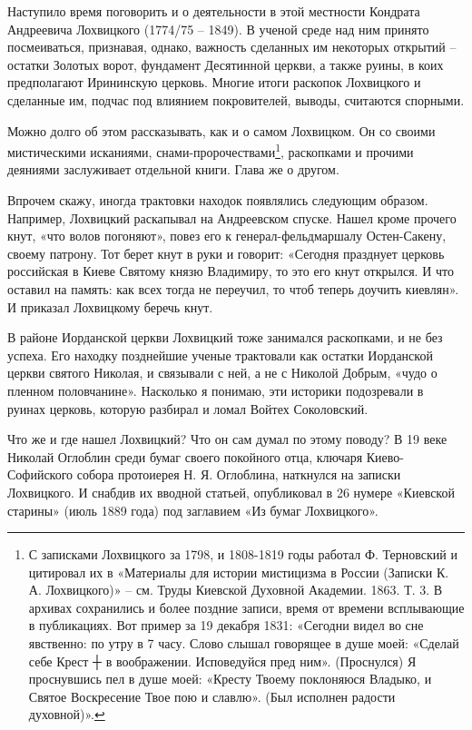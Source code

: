 Наступило время поговорить и о деятельности в этой местности Кондрата Андреевича Лохвицкого (1774/75 – 1849). В ученой среде над ним принято посмеиваться, признавая, однако, важность сделанных им некоторых открытий – остатки Золотых ворот, фундамент Десятинной церкви, а также руины, в коих предполагают Ирининскую церковь. Многие итоги раскопок Лохвицкого и сделанные им, подчас под влиянием покровителей, выводы, считаются спорными. 

Можно долго об этом рассказывать, как и о самом Лохвицком. Он со своими мистическими исканиями, снами-пророчествами\footnote{С записками Лохвицкого за 1798, и 1808-1819 годы работал Ф. Терновский и цитировал их в «Материалы для истории мистицизма в России (Записки К. А. Лохвицкого)» – см. Труды Киевской Духовной Академии. 1863. Т. 3. В архивах сохранились и более поздние записи, время от времени всплывающие в публикациях. Вот пример за 19 декабря 1831: «Сегодни видел во сне явственно: по утру в 7 часу. Слово слышал говорящее в душе моей: «Сделай себе Крест ┼ в воображении. Исповедуйся пред ним». (Проснулся) Я проснувшись пел в душе моей: «Кресту Твоему поклоняюся Владыко, и Святое Воскресение Твое пою и славлю». (Был исполнен радости духовной)».}, раскопками и прочими деяниями заслуживает отдельной книги. Глава же о другом.

Впрочем скажу, иногда трактовки находок появлялись следующим образом. Например, Лохвицкий раскапывал на Андреевском спуске. Нашел кроме прочего кнут, «что волов погоняют», повез его к генерал-фельдмаршалу Остен-Сакену, своему патрону. Тот берет кнут в руки и говорит: «Сегодня празднует церковь российская в Киеве Святому князю Владимиру, то это его кнут открылся. И что оставил на память: как всех тогда не переучил, то чтоб теперь доучить киевлян». И приказал Лохвицкому беречь кнут.

В районе Иорданской церкви Лохвицкий тоже занимался раскопками, и не без успеха. Его находку позднейшие ученые трактовали как остатки Иорданской церкви святого Николая, и связывали с ней, а не с Николой Добрым, «чудо о пленном половчанине». Насколько я понимаю, эти историки подозревали в руинах церковь, которую разбирал и ломал Войтех Соколовский.

Что же и где нашел Лохвицкий? Что он сам думал по этому поводу? В 19 веке Николай Оглоблин среди бумаг своего покойного отца, ключаря Киево-Софийского собора протоиерея Н. Я. Оглоблина, наткнулся на записки Лохвицкого. И снабдив их вводной статьей, опубликовал в 26 нумере «Киевской старины» (июль 1889 года) под заглавием «Из бумаг Лохвицкого».

